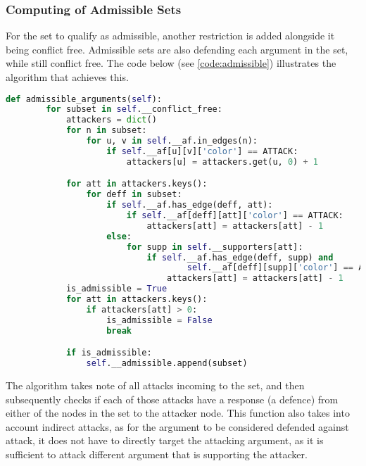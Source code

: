         \subsubsection{Computing of Admissible Sets}
        
            For the set to qualify as admissible, another restriction is added alongside it being conflict free. Admissible sets are also defending each argument in the set, while still conflict free. The code below (see \cref{code:admissible}) illustrates the algorithm that achieves this.
            
            \begin{lstlisting}[language=Python, caption=Admissible Arguments, label=code:admissible]
    def admissible_arguments(self):
        for subset in self.__conflict_free:
            attackers = dict()
            for n in subset:
                for u, v in self.__af.in_edges(n):
                    if self.__af[u][v]['color'] == ATTACK:
                        attackers[u] = attackers.get(u, 0) + 1

            for att in attackers.keys():
                for deff in subset:
                    if self.__af.has_edge(deff, att):
                        if self.__af[deff][att]['color'] == ATTACK:
                            attackers[att] = attackers[att] - 1
                    else:
                        for supp in self.__supporters[att]:
                            if self.__af.has_edge(deff, supp) and
                                    self.__af[deff][supp]['color'] == ATTACK:
                                attackers[att] = attackers[att] - 1
            is_admissible = True
            for att in attackers.keys():
                if attackers[att] > 0:
                    is_admissible = False
                    break

            if is_admissible:
                self.__admissible.append(subset)
            \end{lstlisting}
            
            The algorithm takes note of all attacks incoming to the set, and then subsequently checks if each of those attacks have a response (a defence) from either of the nodes in the set to the attacker node. This function also takes into account indirect attacks, as for the argument to be considered defended against attack, it does not have to directly target the attacking argument, as it is sufficient to attack different argument that is supporting the attacker.
            
